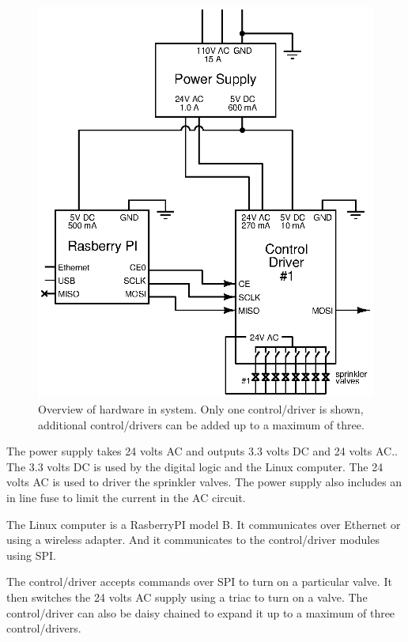 \documentclass{article}
\begin{document}
\begin{figure}[h!]
\begin{center}
\includegraphics[scale=0.9]{xcircuit/hardware_overview}
\end{center}
\caption{Overview of hardware in system.
Only one control/driver is shown, 
additional control/drivers can be added up to a maximum of three.}
\label{fig:hwoview}
\end{figure}

The power supply takes 24 volts AC and outputs 3.3 volts DC
and 24 volts AC..
The 3.3 volts DC is used by the digital logic and the Linux computer.
The 24 volts AC is used to driver the sprinkler valves.
The power supply also includes an in line fuse to limit the current in
the AC circuit.

The Linux computer is a RasberryPI model B.
It communicates over Ethernet or using a wireless adapter.
And it communicates to the control/driver modules using SPI.

The control/driver accepts commands over SPI to turn on a particular valve.
It then switches the 24 volts AC supply using a triac to turn on a valve.
The control/driver can also be daisy chained to expand it up to a maximum
of three control/drivers.
\end{document}
